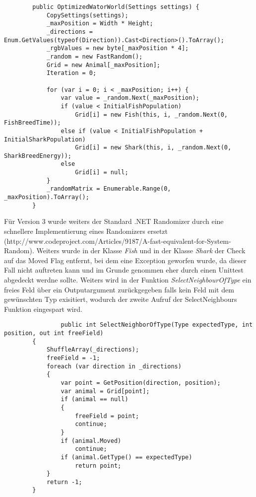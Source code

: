 \documentclass[a4paper,ngerman]{scrartcl}
\begin{document}
	\begin{lstlisting}
        public OptimizedWatorWorld(Settings settings) {
            CopySettings(settings);
            _maxPosition = Width * Height;
            _directions = Enum.GetValues(typeof(Direction)).Cast<Direction>().ToArray();
            _rgbValues = new byte[_maxPosition * 4];
            _random = new FastRandom();
            Grid = new Animal[_maxPosition];
            Iteration = 0;

            for (var i = 0; i < _maxPosition; i++) {
                var value = _random.Next(_maxPosition);
                if (value < InitialFishPopulation) 
                    Grid[i] = new Fish(this, i, _random.Next(0, FishBreedTime));
                else if (value < InitialFishPopulation + InitialSharkPopulation) 
                    Grid[i] = new Shark(this, i, _random.Next(0, SharkBreedEnergy));
                else 
                    Grid[i] = null;
            }
            _randomMatrix = Enumerable.Range(0, _maxPosition).ToArray();
        }
				\end{lstlisting}
Für Version 3 wurde weiters der Standard .NET Randomizer durch eine schnellere Implementierung eines Randomizers ersetzt (http://www.codeproject.com/Articles/9187/A-fast-equivalent-for-System-Random). Weiters wurde in der Klasse \textit{Fish} und in der Klasse \textit{Shark} der Check auf das Moved Flag entfernt, bei dem eine Exception geworfen wurde, da dieser Fall nicht auftreten kann und im Grunde genommen eher durch einen Unittest abgedeckt werdne sollte. Weiters wird in der Funktion \textit{SelectNeighbourOfType} ein freies Feld über ein Outputargument zurückgegeben falls kein Feld mit dem gewünschten Typ exisitiert, wodurch der zweite Aufruf der SelectNeighbours Funktion eingespart wird.

	\begin{lstlisting}
				public int SelectNeighborOfType(Type expectedType, int position, out int freeField)
        {
            ShuffleArray(_directions);
            freeField = -1;
            foreach (var direction in _directions)
            {
                var point = GetPosition(direction, position);
                var animal = Grid[point];
                if (animal == null)
                {
                    freeField = point;
                    continue;
                }
                if (animal.Moved)
                    continue;
                if (animal.GetType() == expectedType)
                    return point;
            }
            return -1;
        }
	\end{lstlisting}
\end{document}
